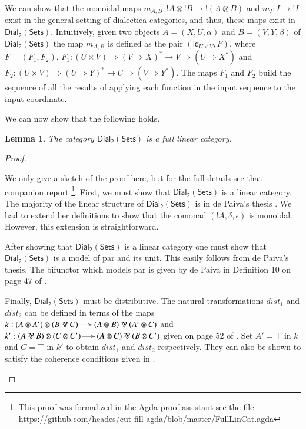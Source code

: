 \documentclass[preprint,12pt]{elsarticle}
\newcommand{\dial}[0]{\mathsf{Dial_2}(\mathsf{Sets})}
\newcommand{\id}[0]{\mathsf{id}}
\newtheorem{lemma}[theorem]{Lemma}
\begin{document}
We can show that the monoidal maps $m_{A,B} : !A \otimes !B \to !(A
\otimes B)$ and $m_I : I \to !I$ exist in the general setting of
dialectica categories, and thus, these maps exist in $\dial$.
Intuitively, given
two objects $A = (X,U,\alpha)$ and $B = (V,Y,\beta)$ of $\dial$ the
map $m_{A,B}$ is defined as the pair $(\id_{U \times V},F)$, where $F
= (F_1,F_2)$, $F_1 : (U \times V) \Rightarrow (V \Rightarrow X)^* \to
V \Rightarrow (U \Rightarrow X^*)$ and $F_2 : (U \times V) \Rightarrow
(U \Rightarrow Y)^* \to U \Rightarrow (V \Rightarrow Y^*)$.  The maps
$F_1$ and $F_2$ build the sequence of all the results of applying each
function in the input sequence to the input coordinate.

We can now show that the following holds.
\begin{lemma}
  \label{lemma:ddial_is_a_linear_category}
  The category $\dial$ is a full linear category.
\end{lemma}
\begin{proof}
  \begin{paper}
    We only give a sketch of the proof here, but for the full details
    see that companion report \cite{Eades:2015}\footnote{This proof
      was formalized in the Agda proof assistant see the file
      \url{https://github.com/heades/cut-fill-agda/blob/master/FullLinCat.agda}}. First,
    we must show that $\dial$ is a linear category.  The majority of
    the linear structure of $\dial$ is in de Paiva's thesis
    \cite{dePaiva:1988}.  We had to extend her definitions to show
    that the comonad $(!A,\delta,\epsilon)$ is monoidal. However, this extension
    is straightforward.

    After showing that $\dial$ is a linear category one must show that
    $\dial$ is a model of par and its unit.  This easily follows from
    de Paiva's thesis.  The bifunctor which models par is given by de
    Paiva in Definition 10 on page 47 of \cite{dePaiva:1988}.

    Finally, $\dial$ must be distributive.  The natural
    transformations $dist_1$ and $dist_2$ can be defined in terms of
    the maps $k : (A \otimes A') \otimes (B \parr C) \to (A \otimes B)
    \parr (A' \otimes C)$ and $k' : (A \parr B) \otimes (C \otimes C')
    \to (A \otimes C) \parr (B \otimes C')$ given on page 52 of
    \cite{dePaiva:1988}.  Set $A' = \top$ in $k$ and $C = \top$ in
    $k'$ to obtain $dist_1$ and $dist_2$ respectively.  They can also
    be shown to satisfy the coherence conditions given in
    \cite{Cockett:1997}.
  \end{paper}
  
\end{proof}
\end{document}
